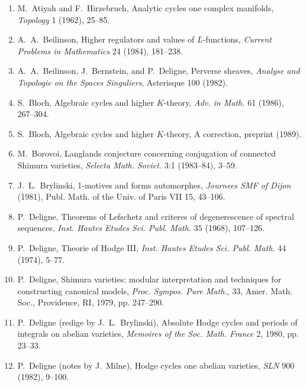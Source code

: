 \documentclass[11pt,a4paper]{article}
\theoremstyle{plain}
\theoremstyle{definition}
\begin{document}
\begin{enumerate}
\item[{[1]}] M.~Atiyah and F.~Hirzebruch, Analytic cycles one complex manifolds, \textit{Topology} 1 (1962), 25--85.

\item[{[2]}] A.~A.~Beilinson, Higher regulators and values of $L$-functions, \textit{Current Problems in Mathematics} 24 (1984), 181--238.

\item[{[3]}] A.~A.~Beilinson, J.~Bernstein, and P.~Deligne, Perverse sheaves, \textit{Analyse and Topologie on the Spaces Singuliers}, Asterisque 100 (1982).

\item[{[4]}] S.~Bloch, Algebraic cycles and higher $K$-theory, \textit{Adv. in Math.} 61 (1986), 267--304.

\item[{[5]}] S.~Bloch, Algebraic cycles and higher $K$-theory, A correction, preprint (1989).

\item[{[6]}] M.~Borovoi, Langlands conjecture concerning conjugation of connected Shimura varieties, \textit{Selecta Math. Soviet.} 3:1 (1983--84), 3--59.

\item[{[7]}] J.~L.~Brylinski, 1-motives and forms automorphes, \textit{Journees SMF of Dijon} (1981), Publ. Math. of the Univ. of Paris VII 15, 43--106.

\item[{[8]}] P.~Deligne, Theorems of Lefschetz and criteres of degenerescence of spectral sequences, \textit{Inst. Hautes Etudes Sci. Publ. Math.} 35 (1968), 107--126.

\item[{[9]}] P.~Deligne, Theorie of Hodge III, \textit{Inst. Hautes Etudes Sci. Publ. Math.} 44 (1974), 5--77.

\item[{[10]}] P.~Deligne, Shimura varieties: modular interpretation and techniques for constructing canonical models, \textit{Proc. Sympos. Pure Math.}, 33, Amer. Math. Soc., Providence, RI, 1979, pp. 247--290.

\item[{[11]}] P.~Deligne (redige by J.~L.~Brylinski), Absolute Hodge cycles and periods of integrals on abelian varieties, \textit{Memoires of the Soc. Math. France} 2, 1980, pp. 23--33.

\item[{[12]}] P.~Deligne (notes by J.~Milne), Hodge cycles one abelian varieties, \textit{SLN} 900 (1982), 9--100.


\end{enumerate}
\end{document}
